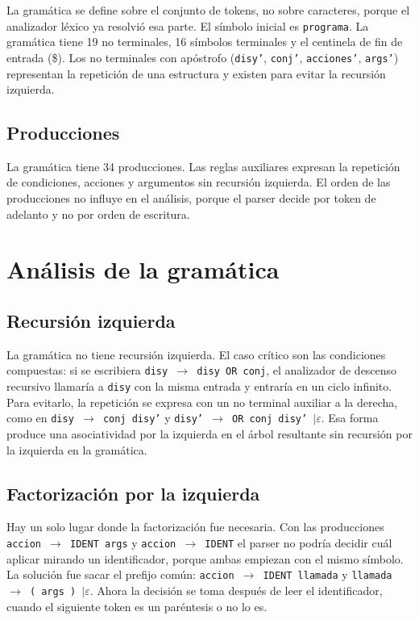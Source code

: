 \documentclass[11pt,letterpaper]{article}
\newcommand{\code}[1]{\texttt{#1}}
\begin{document}
La gramática se define sobre el conjunto de tokens, no sobre caracteres, porque el analizador léxico ya resolvió esa parte. El símbolo inicial es \code{programa}. La gramática tiene 19 no terminales, 16 símbolos terminales y el centinela de fin de entrada (\$). Los no terminales con apóstrofo (\code{disy'}, \code{conj'}, \code{acciones'}, \code{args'}) representan la repetición de una estructura y existen para evitar la recursión izquierda.

\subsection{Producciones}



La gramática tiene 34 producciones. Las reglas auxiliares expresan la repetición de condiciones, acciones y argumentos sin recursión izquierda. El orden de las producciones no influye en el análisis, porque el parser decide por token de adelanto y no por orden de escritura.

\section{Análisis de la gramática}

\subsection{Recursión izquierda}

La gramática no tiene recursión izquierda. El caso crítico son las condiciones compuestas: si se escribiera \code{disy $\rightarrow$ disy OR conj}, el analizador de descenso recursivo llamaría a \code{disy} con la misma entrada y entraría en un ciclo infinito. Para evitarlo, la repetición se expresa con un no terminal auxiliar a la derecha, como en \code{disy $\rightarrow$ conj disy'} y \code{disy' $\rightarrow$ OR conj disy' $\mid \varepsilon$}. Esa forma produce una asociatividad por la izquierda en el árbol resultante sin recursión por la izquierda en la gramática.

\subsection{Factorización por la izquierda}

Hay un solo lugar donde la factorización fue necesaria. Con las producciones \code{accion $\rightarrow$ IDENT args} y \code{accion $\rightarrow$ IDENT} el parser no podría decidir cuál aplicar mirando un identificador, porque ambas empiezan con el mismo símbolo. La solución fue sacar el prefijo común: \code{accion $\rightarrow$ IDENT llamada} y \code{llamada $\rightarrow$ ( args ) $\mid \varepsilon$}. Ahora la decisión se toma después de leer el identificador, cuando el siguiente token es un paréntesis o no lo es.
\end{document}

